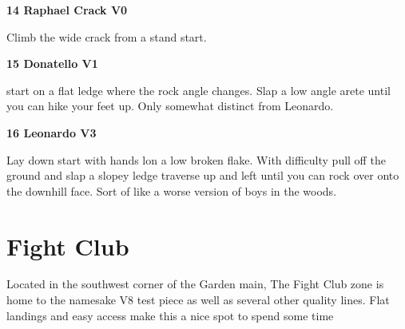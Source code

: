 \begin{multicols}{2}
\begin{minipage}{\columnwidth}
			\end{minipage}
			

					\begin{minipage}{\linewidth}	
					\label{rt:Raphael Crack}
\colorbox{green!20}{
\parbox{0.95\textwidth}{
\textbf{
14 Raphael Crack V0   
}
}
}

					\begin{adjustwidth}{0.5cm}{}				
					Climb the wide crack from a stand start.
					\end{adjustwidth}
					\end{minipage}
					\begin{minipage}{\linewidth}	
					\label{rt:Donatello}
\colorbox{green!20}{
\parbox{0.95\textwidth}{
\textbf{
15 Donatello V1   
}
}
}

					\begin{adjustwidth}{0.5cm}{}				
					start on a flat ledge where the rock angle changes. Slap a low angle arete until you can hike your feet up. Only somewhat distinct from Leonardo.
					\end{adjustwidth}
					\end{minipage}
					\begin{minipage}{\linewidth}	
					\label{rt:Leonardo}
\colorbox{green!20}{
\parbox{0.95\textwidth}{
\textbf{
16 Leonardo V3   
}
}
}

					\begin{adjustwidth}{0.5cm}{}				
					Lay down start with hands lon a low broken flake. With difficulty pull off the ground and slap a slopey ledge traverse up and left until you can rock over onto the downhill face. Sort of like a worse version of boys in the woods.
					\end{adjustwidth}
					\end{minipage}
\newpage

		\section{Fight Club}\label{sa:Fight Club}
	\begin{minipage}{\columnwidth}
	Located in the southwest corner of the Garden main, The Fight Club zone is home to the namesake V8 test piece as well as several other quality lines. Flat landings and easy access make this a nice spot to spend some time
	\end{minipage}
	

\end{multicols}
